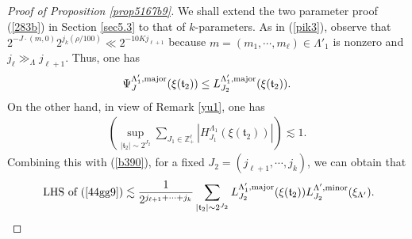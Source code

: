 \documentclass[11 pt,letterpaper]{amsart}
\theoremstyle{plain}
\theoremstyle{definition}
\theoremstyle{remark} \theoremstyle{exam} \theoremstyle{ob}
\numberwithin{equation}{section}
\begin{document}
\begin{proof}[Proof of Proposition \ref{prop5167b9}] 
We shall extend the two parameter proof   (\ref{283b})  in Section \ref{sec5.3} to that of $k$-parameters.
As in (\ref{pik3}),  
observe that  $2^{-J\cdot (m,0)} 2^{j_k(\rho/100) } \ll 2^{-10Kj_{\ell+1} }$ because $m=(m_1,\cdots,m_\ell) \in \Lambda'_1$ is nonzero and $j_{\ell}\gg_{\Lambda} j_{\ell+1}$. Thus, one has
\begin{align}\label{b390}
\Psi_{J}^{\Lambda'_1,\mathrm{major}}( \xi(\mathfrak{t}_2)) \le L^{\Lambda_{1}',\rm{major}}_{J_2}(\xi(\mathfrak{t}_2) ).
\end{align}
On the other hand, in view of Remark \ref{yu1}, one has
\begin{align*} 
   \left(\sup_{|\mathfrak{t}_2| \sim 2^{J_2} } \sum_{J_1\in \mathbb{Z}_+^{\ell} }|H^{\Lambda_{1}}_{J_1}(\xi(\mathfrak{t}_2)) |   \right)\lesssim 1.
\end{align*} 
Combining this with (\ref{b390}), for a fixed $J_2=(j_{\ell+1},\cdots,j_k)$, we can obtain that
\begin{align} \label{v011}
\text{ LHS of (\ref{44gg9})} \lesssim \frac{1}{2^{j_{\ell+1}+\cdots+j_k}} \sum_{|\mathfrak{t}_{2}|\sim 2^{J_2}}  
L^{\Lambda_{1}',\rm{major}}_{J_2}(\xi(\mathfrak{t}_2) )L^{\Lambda',\rm{minor}}_{J_2}(\xi_{\Lambda'}).
\end{align} 


\end{proof}
\end{document}
